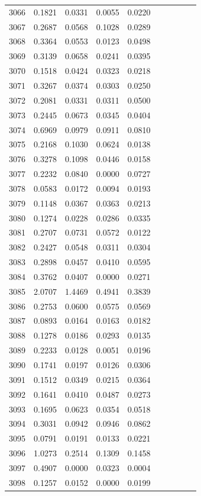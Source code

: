 \begin{table}
\begin{tabular}{cccccccccc}
3066& 0.1821& 0.0331& 0.0055& 0.0220\\ 
3067& 0.2687& 0.0568& 0.1028& 0.0289\\ 
3068& 0.3364& 0.0553& 0.0123& 0.0498\\ 
3069& 0.3139& 0.0658& 0.0241& 0.0395\\ 
3070& 0.1518& 0.0424& 0.0323& 0.0218\\ 
3071& 0.3267& 0.0374& 0.0303& 0.0250\\ 
3072& 0.2081& 0.0331& 0.0311& 0.0500\\ 
3073& 0.2445& 0.0673& 0.0345& 0.0404\\ 
3074& 0.6969& 0.0979& 0.0911& 0.0810\\ 
3075& 0.2168& 0.1030& 0.0624& 0.0138\\ 
3076& 0.3278& 0.1098& 0.0446& 0.0158\\ 
3077& 0.2232& 0.0840& 0.0000& 0.0727\\ 
3078& 0.0583& 0.0172& 0.0094& 0.0193\\ 
3079& 0.1148& 0.0367& 0.0363& 0.0213\\ 
3080& 0.1274& 0.0228& 0.0286& 0.0335\\ 
3081& 0.2707& 0.0731& 0.0572& 0.0122\\ 
3082& 0.2427& 0.0548& 0.0311& 0.0304\\ 
3083& 0.2898& 0.0457& 0.0410& 0.0595\\ 
3084& 0.3762& 0.0407& 0.0000& 0.0271\\ 
3085& 2.0707& 1.4469& 0.4941& 0.3839\\ 
3086& 0.2753& 0.0600& 0.0575& 0.0569\\ 
3087& 0.0893& 0.0164& 0.0163& 0.0182\\ 
3088& 0.1278& 0.0186& 0.0293& 0.0135\\ 
3089& 0.2233& 0.0128& 0.0051& 0.0196\\ 
3090& 0.1741& 0.0197& 0.0126& 0.0306\\ 
3091& 0.1512& 0.0349& 0.0215& 0.0364\\ 
3092& 0.1641& 0.0410& 0.0487& 0.0273\\ 
3093& 0.1695& 0.0623& 0.0354& 0.0518\\ 
3094& 0.3031& 0.0942& 0.0946& 0.0862\\ 
3095& 0.0791& 0.0191& 0.0133& 0.0221\\ 
3096& 1.0273& 0.2514& 0.1309& 0.1458\\ 
3097& 0.4907& 0.0000& 0.0323& 0.0004\\ 
3098& 0.1257& 0.0152& 0.0000& 0.0199\\ 

\end{tabular}
\end{table}
